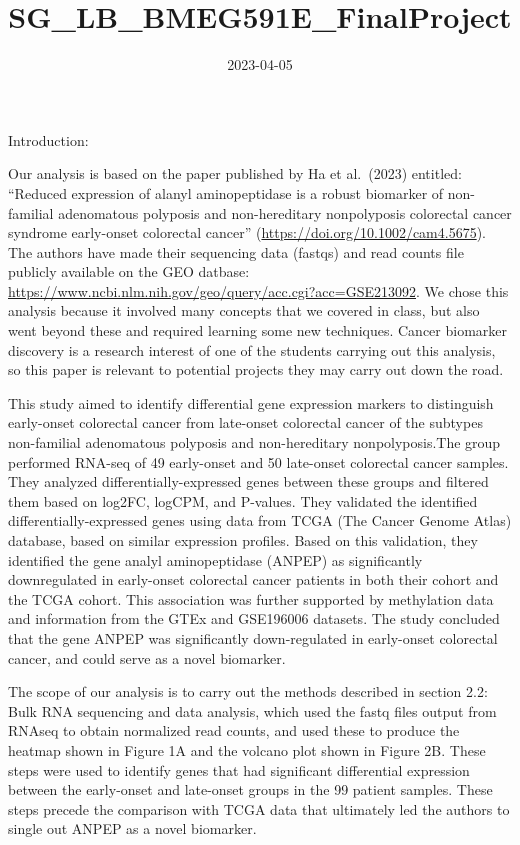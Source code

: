 \documentclass[
]{article}
\title{SG\_LB\_BMEG591E\_FinalProject}
\author{}
\date{\vspace{-2.5em}2023-04-05}
\begin{document}
\maketitle

Introduction:

Our analysis is based on the paper published by Ha et al.~(2023)
entitled: ``Reduced expression of alanyl aminopeptidase is a robust
biomarker of non-familial adenomatous polyposis and non-hereditary
nonpolyposis colorectal cancer syndrome early-onset colorectal cancer''
(\url{https://doi.org/10.1002/cam4.5675}). The authors have made their
sequencing data (fastqs) and read counts file publicly available on the
GEO datbase:
\url{https://www.ncbi.nlm.nih.gov/geo/query/acc.cgi?acc=GSE213092}. We
chose this analysis because it involved many concepts that we covered in
class, but also went beyond these and required learning some new
techniques. Cancer biomarker discovery is a research interest of one of
the students carrying out this analysis, so this paper is relevant to
potential projects they may carry out down the road.

This study aimed to identify differential gene expression markers to
distinguish early-onset colorectal cancer from late-onset colorectal
cancer of the subtypes non-familial adenomatous polyposis and
non-hereditary nonpolyposis.The group performed RNA-seq of 49
early-onset and 50 late-onset colorectal cancer samples. They analyzed
differentially-expressed genes between these groups and filtered them
based on log2FC, logCPM, and P-values. They validated the identified
differentially-expressed genes using data from TCGA (The Cancer Genome
Atlas) database, based on similar expression profiles. Based on this
validation, they identified the gene analyl aminopeptidase (ANPEP) as
significantly downregulated in early-onset colorectal cancer patients in
both their cohort and the TCGA cohort. This association was further
supported by methylation data and information from the GTEx and
GSE196006 datasets. The study concluded that the gene ANPEP was
significantly down-regulated in early-onset colorectal cancer, and could
serve as a novel biomarker.

The scope of our analysis is to carry out the methods described in
section 2.2: Bulk RNA sequencing and data analysis, which used the fastq
files output from RNAseq to obtain normalized read counts, and used
these to produce the heatmap shown in Figure 1A and the volcano plot
shown in Figure 2B. These steps were used to identify genes that had
significant differential expression between the early-onset and
late-onset groups in the 99 patient samples. These steps precede the
comparison with TCGA data that ultimately led the authors to single out
ANPEP as a novel biomarker.
\end{document}
